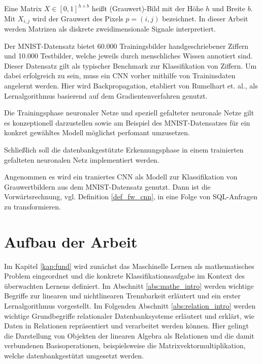 \begin{defi}
    \label{def:image}
    Eine Matrix $X \in [0,1]^{h \times b}$ heißt (Grauwert)-Bild mit der Höhe $h$ und Breite $b$. Mit $X_{i,j}$ wird der Grauwert des Pixels $p=(i,j)$ bezeichnet. In dieser Arbeit werden Matrizen als diskrete zweidimensionale Signale interpretiert.
\end{defi}
Der MNIST-Datensatz bietet 60.000 Trainingsbilder handgeschriebener Ziffern und 10.000 Testbilder, welche jeweils durch menschliches
Wissen annotiert sind. Dieser Datensatz gilt als typischer Benchmark zur Klassifikation von Ziffern. Um dabei erfolgreich zu sein, muss ein CNN vorher mithilfe von Traininsdaten angelernt werden. Hier wird Backpropagation, etabliert von Rumelhart et. al.\cite{MLPbook}, als Lernalgorithmus basierend auf dem Gradientenverfahren 
genutzt.
\begin{problem}
    \label{prop:train}
    Die Trainingsphase neuronaler Netze und speziell gefalteter neuronale Netze gilt es konzeptionell darzustellen sowie am Beispiel des MNIST-Datensatzes für ein konkret gewähltes Modell möglichst perfomant umzusetzen. 
\end{problem}

Schließlich soll die datenbankgestützte Erkennungsphase in einem trainierten gefalteten neuronalen Netz implementiert werden.

\begin{problem}
    \label{prob:ffCCN}
    Angenommen es wird ein traniertes CNN als Modell zur Klassifikation von Grauwertbildern aus dem MNIST-Datensatz genutzt. Dann ist die Vorwärtsrechnung, vgl. Definition \ref{def_fw_cnn}, in eine Folge von SQL-Anfragen zu transformieren.
\end{problem}

\section*{Aufbau der Arbeit}
\label{abs:glied}
Im Kapitel \ref{kap:fund} wird zunächst das Maschinelle Lernen als mathematisches Problem eingeordnet und die konkrete Klassifikationsaufgabe im Kontext des überwachten Lernens definiert. Im Abschnitt \ref{abs:mathe_intro} werden wichtige Begriffe zur linearen und nichtlinearen Trennbarkeit erläutert und ein erster Lernalgorithmus vorgestellt. Im Folgenden Abschnitt \ref{abs:relation_intro} werden wichtige Grundbegriffe relationaler Datenbanksysteme erläutert und erklärt, wie Daten in Relationen repräsentiert und verarbeitet werden können. Hier gelingt die Darstellung von Objekten der linearen Algebra als Relationen und die damit verbundenen Basisoperationen, beispielsweise die Matrixvektormultiplikation, welche datenbankgestützt umgesetzt werden.

